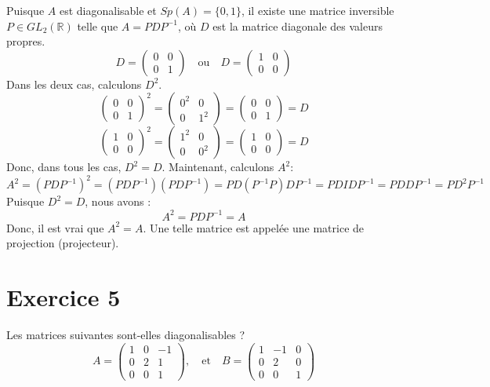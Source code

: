 \begin{solution}
Puisque $A$ est diagonalisable et $Sp(A) = \{0, 1\}$, il existe une matrice inversible $P \in GL_2(\mathbb{R})$ telle que $A = PDP^{-1}$, où $D$ est la matrice diagonale des valeurs propres.
\[ D = \begin{pmatrix} 0 & 0 \\ 0 & 1 \end{pmatrix} \quad \text{ou} \quad D = \begin{pmatrix} 1 & 0 \\ 0 & 0 \end{pmatrix} \]
Dans les deux cas, calculons $D^2$.
\[ \begin{pmatrix} 0 & 0 \\ 0 & 1 \end{pmatrix}^2 = \begin{pmatrix} 0^2 & 0 \\ 0 & 1^2 \end{pmatrix} = \begin{pmatrix} 0 & 0 \\ 0 & 1 \end{pmatrix} = D \]
\[ \begin{pmatrix} 1 & 0 \\ 0 & 0 \end{pmatrix}^2 = \begin{pmatrix} 1^2 & 0 \\ 0 & 0^2 \end{pmatrix} = \begin{pmatrix} 1 & 0 \\ 0 & 0 \end{pmatrix} = D \]
Donc, dans tous les cas, $D^2 = D$.
Maintenant, calculons $A^2$:
\[ A^2 = (PDP^{-1})^2 = (PDP^{-1})(PDP^{-1}) = PD(P^{-1}P)DP^{-1} = PDIDP^{-1} = PDDP^{-1} = PD^2P^{-1} \]
Puisque $D^2 = D$, nous avons :
\[ A^2 = PD P^{-1} = A \]
Donc, il est vrai que $A^2 = A$. Une telle matrice est appelée une matrice de projection (projecteur).
\end{solution}

\section{Exercice 5}
Les matrices suivantes sont-elles diagonalisables ?
\[ A = \begin{pmatrix} 1 & 0 & -1 \\ 0 & 2 & 1 \\ 0 & 0 & 1 \end{pmatrix}, \quad \text{et} \quad B = \begin{pmatrix} 1 & -1 & 0 \\ 0 & 2 & 0 \\ 0 & 0 & 1 \end{pmatrix} \]

